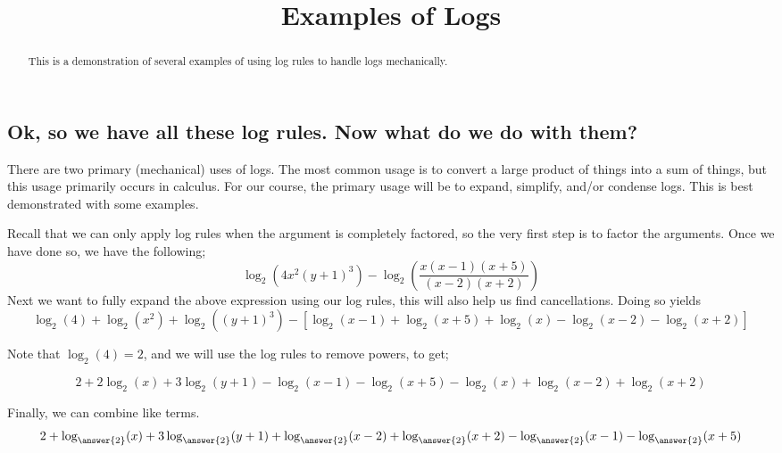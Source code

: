 \documentclass{ximera}
\title{Examples of Logs}
\begin{document}
\begin{abstract}
    This is a demonstration of several examples of using log rules to handle logs mechanically.
\end{abstract}
\maketitle


\subsection*{Ok, so we have all these log rules. Now what do we do with them?}
     
    There are two primary (mechanical) uses of logs. The most common usage is to convert a large product of things into a sum of things, but this usage primarily occurs in calculus. For our course, the primary usage will be to expand, simplify, and/or condense logs. This is best demonstrated with some examples.
    
    \begin{example}%
        Recall that we can only apply log rules when the argument is completely factored, so the very first step is to factor the arguments. Once we have done so, we have the following;
        \[
            \log_2\left(4x^2(y+1)^3\right) - \log_2\left(\frac{x(x-1)(x+5)}{(x-2)(x+2)}\right)
        \]
        Next we want to fully expand the above expression using our log rules, this will also help us find cancellations. Doing so yields
        \[
            \log_2(4) + \log_2(x^2) + \log_2((y+1)^3) - 
                \left[ \log_2(x-1) + \log_2(x+5) + \log_2(x) - \log_2(x-2) - \log_2(x + 2) \right]
        \]
        
        Note that $\log_2(4) = 2$, and we will use the log rules to remove powers, to get;
        
        \[
            2 + 2\log_2(x) + 3\log_2(y+1) - \log_2(x-1) - \log_2(x+5) - \log_2(x) + \log_2(x-2) + \log_2(x+2)
        \]
        
        Finally, we can combine like terms.
        \[
            2 + \log_{\answer{2}}(x) + 3\log_{\answer{2}}(y+1) + \log_{\answer{2}}(x-2) + \log_{\answer{2}}(x+2) - \log_{\answer{2}}(x-1) - \log_{\answer{2}}(x+5)
        \]
        
    \end{example}%
    
\end{document}
